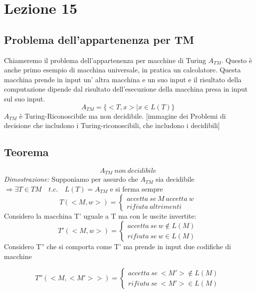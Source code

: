 
\section{Lezione 15}
\subsection{Problema dell'appartenenza per TM}
Chiameremo il problema dell'appartenenza per macchine di Turing $A_{TM}$. Questo è anche primo esempio di macchina universale, in pratica un calcolatore. Questa macchina prende in input un' altra macchina e un suo input e il risultato della computazione dipende dal risultato dell'esecuzione della macchina presa in input sul suo input.
\[
	A_{TM} = \{ <T, x> | x \in L(T)\}
\]
$A_{TM}$ è Turing-Riconoscibile ma non decidibile.
[immagine dei Problemi di decisione che includono i Turing-riconoscibili, che includono i decidibili]
\subsection{Teorema}
\[
	A_{TM}\ non\ decidibile
\]
\textit{Dimostrazione:} Supponiamo per assurdo che $A_{TM}$ sia decidibile $\Rightarrow \exists T \in TM \quad t.c. \quad L(T)=A_{TM}$ e si ferma sempre \\
\begin{equation*}
	T(<M,w>) =
	\begin{cases}
   	accetta \ se \ M \ accetta \ w\\rifiuta \ altrimenti
   	\end{cases}
\end{equation*}
Considero la macchina T' uguale a T ma con le uscite invertite:
\begin{equation*}
	T'(<M,w>) =
	\begin{cases}
   	accetta \ se \ w \notin L(M)\\rifiuta \ se \ w \in L(M)
   	\end{cases}
\end{equation*}
Considero T'' che si comporta come T' ma prende in input due codifiche di macchine

\begin{equation*}
	T''(<M,<M'>>) =
	\begin{cases}
   	accetta \ se \ <M'> \notin L(M)\\rifiuta \ se \ <M'> \in L(M)
   	\end{cases}
\end{equation*}

